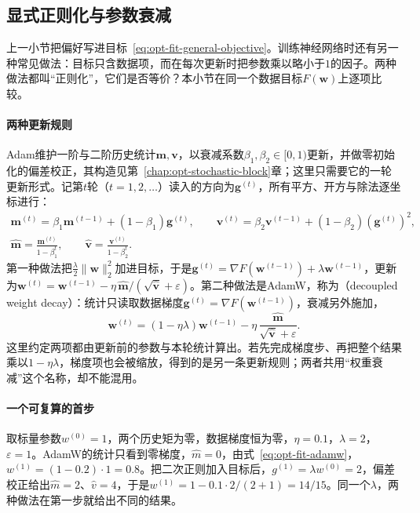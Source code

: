 \subsection{显式正则化与参数衰减}
\label{sec:opt-fit-weight-decay}

上一小节把偏好写进目标~\eqref{eq:opt-fit-general-objective}。训练神经网络时还有另一种常见做法：目标只含数据项，而在每次更新时把参数乘以略小于$1$的因子。两种做法都叫“正则化”，它们是否等价？本小节在同一个数据目标$F(\bm w)$上逐项比较。

\paragraph{两种更新规则}
Adam维护一阶与二阶历史统计$\bm m,\bm v$，以衰减系数$\beta_1,\beta_2\in[0,1)$更新，并做零初始化的偏差校正，其构造见第~\ref{chap:opt-stochastic-block}章；这里只需要它的一轮更新形式。记第$t$轮（$t=1,2,\dots$）读入的方向为$\bm g^{(t)}$，所有平方、开方与除法逐坐标进行：
\[
  \begin{gathered}
  \bm m^{(t)}=\beta_1\bm m^{(t-1)}+(1-\beta_1)\bm g^{(t)},\qquad
  \bm v^{(t)}=\beta_2\bm v^{(t-1)}+(1-\beta_2)(\bm g^{(t)})^2,\\
  \widehat{\bm m}=\frac{\bm m^{(t)}}{1-\beta_1^t},\qquad
  \widehat{\bm v}=\frac{\bm v^{(t)}}{1-\beta_2^t}.
  \end{gathered}
\]
第一种做法把$\tfrac\lambda2\|\bm w\|_2^2$加进目标，于是$\bm g^{(t)}=\nabla F(\bm w^{(t-1)})+\lambda\bm w^{(t-1)}$，更新为$\bm w^{(t)}=\bm w^{(t-1)}-\eta\,\widehat{\bm m}/(\sqrt{\widehat{\bm v}}+\varepsilon)$。第二种做法是AdamW，称为（decoupled weight decay）：统计只读取数据梯度$\bm g^{(t)}=\nabla F(\bm w^{(t-1)})$，衰减另外施加，
\begin{equation}
  \bm w^{(t)}=(1-\eta\lambda)\bm w^{(t-1)}-\eta\,\frac{\widehat{\bm m}}{\sqrt{\widehat{\bm v}}+\varepsilon}.
  \label{eq:opt-fit-adamw}
\end{equation}
这里约定两项都由更新前的参数与本轮统计算出。若先完成梯度步、再把整个结果乘以$1-\eta\lambda$，梯度项也会被缩放，得到的是另一条更新规则；两者共用“权重衰减”这个名称，却不能混用。

\paragraph{一个可复算的首步}
取标量参数$w^{(0)}=1$，两个历史矩为零，数据梯度恒为零，$\eta=0.1$，$\lambda=2$，$\varepsilon=1$。AdamW的统计只看到零梯度，$\widehat m=0$，由式~\eqref{eq:opt-fit-adamw}，$w^{(1)}=(1-0.2)\cdot1=0.8$。把二次正则加入目标后，$g^{(1)}=\lambda w^{(0)}=2$，偏差校正给出$\widehat m=2$、$\widehat v=4$，于是$w^{(1)}=1-0.1\cdot2/(2+1)=14/15$。同一个$\lambda$，两种做法在第一步就给出不同的结果。

